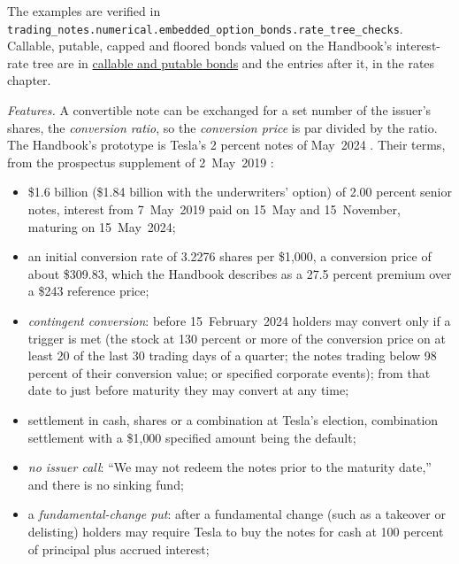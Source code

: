 The examples are verified in \nolinkurl{trading_notes.numerical.embedded_option_bonds.rate_tree_checks}. Callable, putable, capped and floored bonds valued on the Handbook's interest-rate tree are in \hyperref[meth:callable-putable-bond-valuation]{callable and putable bonds} and the entries after it, in the rates chapter.

\begin{qfmethod}\label{meth:convertible-bond-valuation}
 \emph{Features.} A convertible note can be exchanged for a set number of the issuer's shares, the \emph{conversion ratio}, so the \emph{conversion price} is par divided by the ratio. The Handbook's prototype is Tesla's 2 percent notes of May~2024 \citep[chap.~38, pp.~883--890]{s7-fabozzifixed}. Their terms, from the prospectus supplement of 2~May~2019 \citep[The Offering; Description of Notes]{tesla-2024-notes-prospectus-2019}:
\begin{itemize}
\item \$1.6 billion (\$1.84 billion with the underwriters' option) of 2.00 percent senior notes, interest from 7~May~2019 paid on 15~May and 15~November, maturing on 15~May~2024;
\item an initial conversion rate of 3.2276 shares per \$1{,}000, a conversion price of about \$309.83, which the Handbook describes as a 27.5 percent premium over a \$243 reference price;
\item \emph{contingent conversion}: before 15~February~2024 holders may convert only if a trigger is met (the stock at 130 percent or more of the conversion price on at least 20 of the last 30 trading days of a quarter; the notes trading below 98 percent of their conversion value; or specified corporate events); from that date to just before maturity they may convert at any time;
\item settlement in cash, shares or a combination at Tesla's election, combination settlement with a \$1{,}000 specified amount being the default;
\item \emph{no issuer call}: ``We may not redeem the notes prior to the maturity date,'' and there is no sinking fund;
\item a \emph{fundamental-change put}: after a fundamental change (such as a takeover or delisting) holders may require Tesla to buy the notes for cash at 100 percent of principal plus accrued interest;

\end{itemize}
\end{qfmethod}
